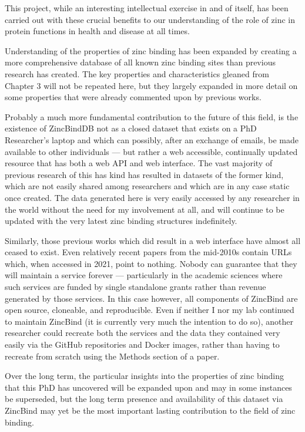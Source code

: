 This project, while an interesting intellectual exercise in and of itself, has been carried out with these crucial benefits to our understanding of the role of zinc in protein functions in health and disease at all times.

Understanding of the properties of zinc binding has been expanded by creating a more comprehensive database of all known zinc binding sites than previous research has created. The key properties and characteristics gleaned from Chapter 3 will not be repeated here, but they largely expanded in more detail on some properties that were already commented upon by previous works.

Probably a much more fundamental contribution to the future of this field, is the existence of ZincBindDB not as a closed dataset that exists on a PhD Researcher's laptop and which can possibly, after an exchange of emails, be made available to other individuals ---  but rather a web accessible, continually updated resource that has both a web API and web interface. The vast majority of previous research of this has kind has resulted in datasets of the former kind, which are not easily shared among researchers and which are in any case static once created. The data generated here is very easily accessed by any researcher in the world without the need for my involvement at all, and will continue to be updated with the very latest zinc binding structures indefinitely.

Similarly, those previous works which did result in a web interface have almost all ceased to exist. Even relatively recent papers from the mid-2010s contain URLs which, when accessed in 2021, point to nothing. Nobody can guarantee that they will maintain a service forever --- particularly in the academic sciences where such services are funded by single standalone grants rather than revenue generated by those services. In this case however, all components of ZincBind are open source, cloneable, and reproducible. Even if neither I nor my lab continued to maintain ZincBind (it is currently very much the intention to do so), another researcher could recreate both the services and the data they contained very easily via the GitHub repositories and Docker images, rather than having to recreate from scratch using the Methods section of a paper.

Over the long term, the particular insights into the properties of zinc binding that this PhD has uncovered will be expanded upon and may in some instances be superseded, but the long term presence and availability of this dataset via ZincBind may yet be the most important lasting contribution to the field of zinc binding.

